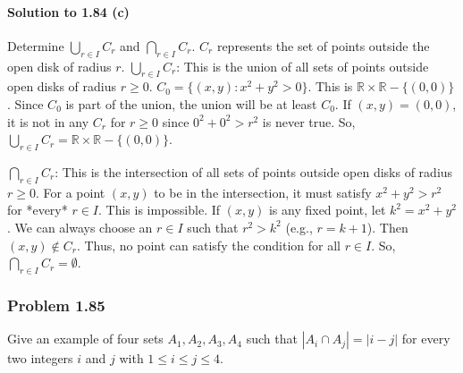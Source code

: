 \documentclass{article}
\begin{document}
\paragraph*{Solution to 1.84 (c)}
Determine $\bigcup_{r \in I} C_r$ and $\bigcap_{r \in I} C_r$.
$C_r$ represents the set of points outside the open disk of radius $r$.
$\bigcup_{r \in I} C_r$: This is the union of all sets of points outside open disks of radius $r \ge 0$.
$C_0 = \{(x,y) : x^2+y^2 > 0\}$. This is $\mathbb{R} \times \mathbb{R} - \{(0,0)\}$.
Since $C_0$ is part of the union, the union will be at least $C_0$.
If $(x,y) = (0,0)$, it is not in any $C_r$ for $r \ge 0$ since $0^2+0^2 > r^2$ is never true.
So, $\bigcup_{r \in I} C_r = \mathbb{R} \times \mathbb{R} - \{(0,0)\}$.

$\bigcap_{r \in I} C_r$: This is the intersection of all sets of points outside open disks of radius $r \ge 0$.
For a point $(x,y)$ to be in the intersection, it must satisfy $x^2+y^2 > r^2$ for *every* $r \in I$.
This is impossible. If $(x,y)$ is any fixed point, let $k^2 = x^2+y^2$. We can always choose an $r \in I$ such that $r^2 > k^2$ (e.g., $r = k+1$). Then $(x,y) \notin C_r$.
Thus, no point can satisfy the condition for all $r \in I$.
So, $\bigcap_{r \in I} C_r = \emptyset$.

\subsubsection*{Problem 1.85}
Give an example of four sets $A_1, A_2, A_3, A_4$ such that $|A_i \cap A_j| = |i - j|$ for every two integers $i$ and $j$ with $1 \le i \le j \le 4$.
\end{document}
